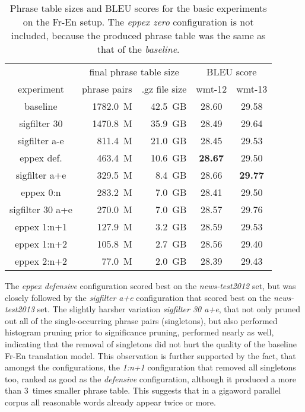 \begin{table}[ht]
\centering
\begin{tabular}{ | c | r r | c c | }
\hline
 & \multicolumn{2}{|c|}{final phrase table size} & \multicolumn{2}{|c|}{BLEU score} \\
experiment & phrase pairs & .gz file size & wmt-12 & wmt-13 \\
\hline
\hline
baseline          & 1782.0~M & 42.5~GB & 28.60 & 29.58 \\
sigfilter 30      & 1470.8~M & 35.9~GB & 28.49 & 29.64 \\
sigfilter a-e     &  811.4~M & 21.0~GB & 28.45 & 29.53 \\
eppex def.        &  463.4~M & 10.6~GB & \textbf{28.67} & 29.50 \\
sigfilter a+e     &  329.5~M &  8.4~GB & 28.66 & \textbf{29.77} \\
eppex 0:n         &  283.2~M &  7.0~GB & 28.41 & 29.50 \\
sigfilter 30 a+e  &  270.0~M &  7.0~GB & 28.57 & 29.76 \\
eppex 1:n+1       &  127.9~M &  3.2~GB & 28.59 & 29.53 \\
eppex 1:n+2       &  105.8~M &  2.7~GB & 28.56 & 29.40 \\
eppex 2:n+2       &   77.0~M &  2.0~GB & 28.39 & 29.43 \\
\hline
\end{tabular}
\caption{\label{fr-en-pt-size-and-bleu}
Phrase table sizes and BLEU scores for the basic experiments on the Fr-En setup.
The \emph{eppex zero} configuration is not included, because the produced phrase table
was the same as that of the \emph{baseline}.}
\end{table}

The \emph{eppex defensive} configuration scored best on the \emph{news-test2012} set,
but was closely followed by the \emph{sigfilter a+e} configuration that scored best on
the \emph{news-test2013} set.
The slightly harsher variation \emph{sigfilter 30 a+e}, that not only pruned out
all of the single-occurring phrase pairs (singletons), but also performed histogram pruning prior to
significance pruning, performed nearly as well, indicating that the removal of
singletons did not hurt the quality of the baseline Fr-En translation model.
This observation is further supported by the fact, that amongst the \eppex{} configurations,
the \emph{1:n+1} configuration that removed all singletons too, ranked as good as
the \emph{defensive} configuration, although it produced a more than 3~times smaller phrase table.
This suggests that in a gigaword parallel corpus all reasonable words already appear twice or more.

